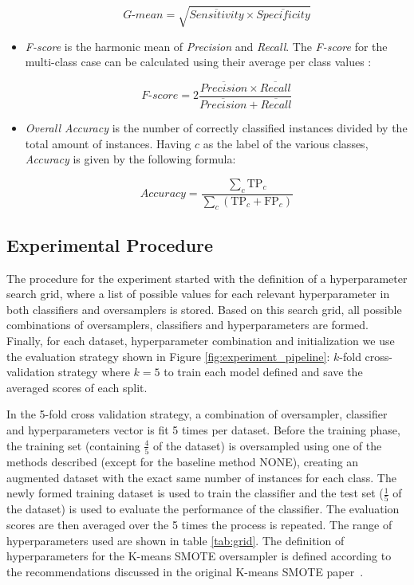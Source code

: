 \documentclass[authoryear,preprint,12pt]{elsarticle}
\begin{document}
\begin{linenumbers}
\begin{itemize}
        $$\textit{G-mean} = \sqrt{ \overline{Sensitivity} \times
        \overline{Specificity}}$$

    \item \textit{F-score} is the harmonic mean of \textit{Precision} and
        \textit{Recall}. The \textit{F-score} for the multi-class case can be
        calculated using their average per class values \citep{He2009}:

          $$\textit{F-score}=2\frac{\overline{Precision} \times
          \overline{Recall}}{\overline{Precision} + \overline{Recall}}$$

    \item \textit{Overall Accuracy} is the number of correctly classified
        instances divided by the total amount of instances. Having \( c \) as
        the label of the various classes, \textit{Accuracy} is given by the
        following formula:

	      $$\textit{Accuracy} = \frac{ \sum\limits_{c}{ \text{TP}_{c} } }{
			      \sum\limits_{c}{ (\text{TP}_{c}  + \text{FP}_{c}) } } $$

\end{itemize}

\subsection{Experimental Procedure}

The procedure for the experiment started with the definition of a
hyperparameter search grid, where a list of possible values for each relevant
hyperparameter in both classifiers and oversamplers is stored. Based on this
search grid, all possible combinations of oversamplers, classifiers and
hyperparameters are formed.  Finally, for each dataset, hyperparameter
combination and initialization we use the evaluation strategy shown in Figure
\ref{fig:experiment_pipeline}: $k$-fold cross-validation strategy where $k=5$
to train each model defined and save the averaged scores of each split.

In the 5-fold cross validation strategy, a combination
of oversampler, classifier and hyperparameters vector is fit 5 times
per dataset. Before the training
phase, the training set
(containing $\frac{4}{5}$ of the dataset) is oversampled using one of the methods
described (except for the baseline method NONE), creating an augmented
dataset with the exact same number of instances for
each class. The newly formed training dataset is used to train the classifier
and the test set ($\frac{1}{5}$ of the dataset)
is used to evaluate the performance of the classifier. The evaluation scores
are then averaged over the 5 times the process is repeated. The range of
hyperparameters used are shown in table \ref{tab:grid}. The definition of
hyperparameters for the K-means SMOTE oversampler is defined according to the
recommendations discussed in the original K-means SMOTE
paper~\citep{Douzas2018}.


\end{linenumbers}
\end{document}
